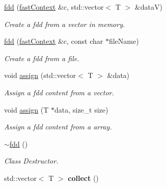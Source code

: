\begin{DoxyCompactItemize}
\hyperlink{classfaster_1_1fdd_a76eee3a3adcb360d9b63bb50c1214de3}{fdd} (\hyperlink{classfaster_1_1fastContext}{fast\+Context} \&c, std\+::vector$<$ T $>$ \&dataV)
\begin{DoxyCompactList}\small\item\em Create a fdd from a vector in memory. \end{DoxyCompactList}\item 
\hypertarget{classfaster_1_1fdd_adc3ebc12c9d508b2957f5e6759544bee}{}\label{classfaster_1_1fdd_adc3ebc12c9d508b2957f5e6759544bee} 
\hyperlink{classfaster_1_1fdd_adc3ebc12c9d508b2957f5e6759544bee}{fdd} (\hyperlink{classfaster_1_1fastContext}{fast\+Context} \&c, const char $\ast$file\+Name)
\begin{DoxyCompactList}\small\item\em Create a fdd from a file. \end{DoxyCompactList}\item 
\hypertarget{classfaster_1_1fdd_ae1a17043db351aea043ab68a92976386}{}\label{classfaster_1_1fdd_ae1a17043db351aea043ab68a92976386} 
void \hyperlink{classfaster_1_1fdd_ae1a17043db351aea043ab68a92976386}{assign} (std\+::vector$<$ T $>$ \&data)
\begin{DoxyCompactList}\small\item\em Assign a fdd content from a vector. \end{DoxyCompactList}\item 
\hypertarget{classfaster_1_1fdd_a8ab9e1a569f83b5bc9cb70777a14297e}{}\label{classfaster_1_1fdd_a8ab9e1a569f83b5bc9cb70777a14297e} 
void \hyperlink{classfaster_1_1fdd_a8ab9e1a569f83b5bc9cb70777a14297e}{assign} (T $\ast$data, size\+\_\+t size)
\begin{DoxyCompactList}\small\item\em Assign a fdd content from a array. \end{DoxyCompactList}\item 
\hypertarget{classfaster_1_1fdd_aea20888cf4c003e7ad518e1a88e94200}{}\label{classfaster_1_1fdd_aea20888cf4c003e7ad518e1a88e94200} 
\hyperlink{classfaster_1_1fdd_aea20888cf4c003e7ad518e1a88e94200}{$\sim$fdd} ()
\begin{DoxyCompactList}\small\item\em Class Destructor. \end{DoxyCompactList}\item 
\hypertarget{classfaster_1_1fdd_a089aa4c91205948dacbc6e6bd6e5bcde}{}\label{classfaster_1_1fdd_a089aa4c91205948dacbc6e6bd6e5bcde} 
std\+::vector$<$ T $>$ {\bfseries collect} ()

\end{DoxyCompactItemize}
